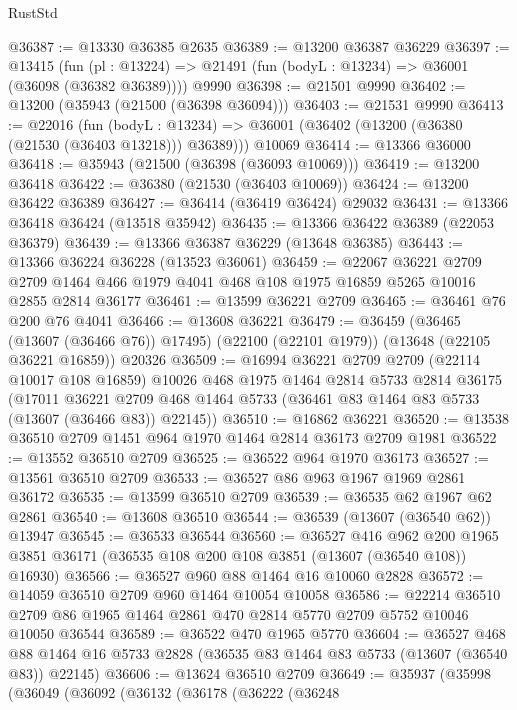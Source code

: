 \begin{lexlean}{RustStd}
\begin{coremodule}
@36387 := @13330 @36385 @2635
@36389 := @13200 @36387 @36229
@36397 := @13415
    (fun (pl : @13224) => @21491 (fun (bodyL : @13234) => @36001 (@36098 (@36382 @36389))))
    @9990
@36398 := @21501 @9990
@36402 := @13200 (@35943 (@21500 (@36398 @36094)))
@36403 := @21531 @9990
@36413 := @22016
    (fun (bodyL : @13234) => @36001 (@36402 (@13200 (@36380 (@21530 (@36403 @13218))) @36389)))
    @10069
@36414 := @13366 @36000
@36418 := @35943 (@21500 (@36398 (@36093 @10069)))
@36419 := @13200 @36418
@36422 := @36380 (@21530 (@36403 @10069))
@36424 := @13200 @36422 @36389
@36427 := @36414 (@36419 @36424) @29032
@36431 := @13366 @36418 @36424 (@13518 @35942)
@36435 := @13366 @36422 @36389 (@22053 @36379)
@36439 := @13366 @36387 @36229 (@13648 @36385)
@36443 := @13366 @36224 @36228 (@13523 @36061)
@36459 := @22067
    @36221
    @2709
    @2709
    @1464
    @466
    @1979
    @4041
    @468
    @108
    @1975
    @16859
    @5265
    @10016
    @2855
    @2814
    @36177
@36461 := @13599 @36221 @2709
@36465 := @36461 @76 @200 @76 @4041
@36466 := @13608 @36221
@36479 := @36459
    (@36465 (@13607 (@36466 @76)) @17495)
    (@22100 (@22101 @1979))
    (@13648 (@22105 @36221 @16859))
    @20326
@36509 := @16994
    @36221
    @2709
    @2709
    (@22114 @10017 @108 @16859)
    @10026
    @468
    @1975
    @1464
    @2814
    @5733
    @2814
    @36175
    (@17011 @36221 @2709 @468 @1464 @5733 (@36461 @83 @1464 @83 @5733 (@13607 (@36466 @83)) @22145))
@36510 := @16862 @36221
@36520 := @13538 @36510 @2709 @1451 @964 @1970 @1464 @2814 @36173 @2709 @1981
@36522 := @13552 @36510 @2709
@36525 := @36522 @964 @1970 @36173
@36527 := @13561 @36510 @2709
@36533 := @36527 @86 @963 @1967 @1969 @2861 @36172
@36535 := @13599 @36510 @2709
@36539 := @36535 @62 @1967 @62 @2861
@36540 := @13608 @36510
@36544 := @36539 (@13607 (@36540 @62)) @13947
@36545 := @36533 @36544
@36560 := @36527
    @416
    @962
    @200
    @1965
    @3851
    @36171
    (@36535 @108 @200 @108 @3851 (@13607 (@36540 @108)) @16930)
@36566 := @36527 @960 @88 @1464 @16 @10060 @2828
@36572 := @14059 @36510 @2709 @960 @1464 @10054 @10058
@36586 := @22214
    @36510
    @2709
    @86
    @1965
    @1464
    @2861
    @470
    @2814
    @5770
    @2709
    @5752
    @10046
    @10050
    @36544
@36589 := @36522 @470 @1965 @5770
@36604 := @36527
    @468
    @88
    @1464
    @16
    @5733
    @2828
    (@36535 @83 @1464 @83 @5733 (@13607 (@36540 @83)) @22145)
@36606 := @13624 @36510 @2709
@36649 := @35937
    (@35998
      (@36049
        (@36092
          (@36132
            (@36178
              (@36222
                (@36248

\end{coremodule}
\end{lexlean}
